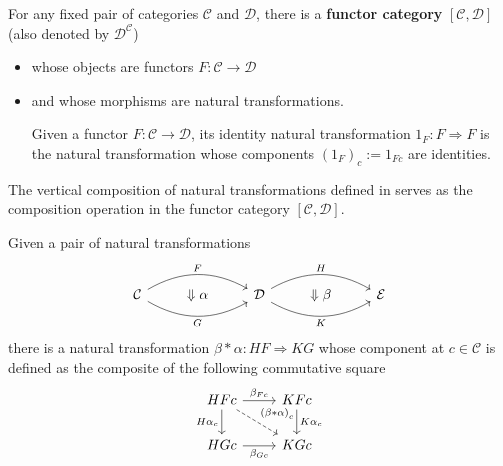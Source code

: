 \documentclass[12pt, oneside]{book}
\begin{document}
\begin{definition}
    For any fixed pair of categories $\mathcal{C}$ and $\mathcal{D}$, there is a \textbf{functor category} $[\mathcal{C},\mathcal{D}]$(also denoted by $\mathcal{D}^{\mathcal{C}}$)
    \begin{itemize}
        \item
              whose objects are functors $F:\mathcal{C} \rightarrow \mathcal{D}$

        \item
              and whose morphisms are natural transformations.

              Given a functor $F: \mathcal{C} \rightarrow \mathcal{D}$, its identity natural transformation $1_F: F \Rightarrow F$ is the natural transformation whose components $\left(1_F\right)_c:=1_{F c}$ are identities.
    \end{itemize}

    \begin{remark}
        The vertical composition of natural transformations defined in serves as the composition operation in the functor category $[\mathcal{C},\mathcal{D}]$.
    \end{remark}
\end{definition}


\begin{lemma}
    \label{lem: horizontal composition}
    Given a pair of natural transformations
    \begin{equation*}
        \begin{tikzcd}
            \mathcal{C} \arrow[rr, "G"', bend right] \arrow[rr, "F", bend left] & \Downarrow \alpha & \mathcal{D} \arrow[rr, "K"', bend right] \arrow[rr, "H", bend left] & \Downarrow \beta & \mathcal{E}
        \end{tikzcd}
    \end{equation*}
    there is a natural transformation $\beta * \alpha: H F \Rightarrow K G$ whose component at $c \in \mathcal{C}$ is defined as the composite of the following commutative square
    \begin{equation*}
        \begin{tikzcd}
            H F c \arrow[r, "\beta_{Fc}"] \arrow[d, "H\alpha_c"'] \arrow[rd,dashed,description,"\left(\beta*\alpha\right)_c"] & K F c \arrow[d, "K\alpha_c"] \\
            H G c \arrow[r, "\beta_{Gc}"']                          & K G c
        \end{tikzcd}
    \end{equation*}
\end{lemma}
\end{document}
